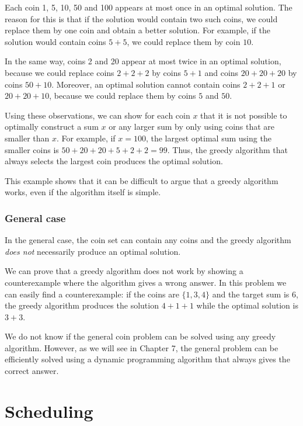 Each coin 1, 5, 10, 50 and 100 appears
at most once in an optimal solution.
The reason for this is that if the
solution would contain two such coins,
we could replace them by one coin and
obtain a better solution.
For example, if the solution would contain
coins $5+5$, we could replace them by coin $10$.

In the same way, coins 2 and 20 appear
at most twice in an optimal solution,
because we could replace
coins $2+2+2$ by coins $5+1$ and
coins $20+20+20$ by coins $50+10$.
Moreover, an optimal solution cannot contain
coins $2+2+1$ or $20+20+10$,
because we could replace them by coins $5$ and $50$.

Using these observations,
we can show for each coin $x$ that
it is not possible to optimally construct
a sum $x$ or any larger sum by only using coins
that are smaller than $x$.
For example, if $x=100$, the largest optimal
sum using the smaller coins is  $50+20+20+5+2+2=99$.
Thus, the greedy algorithm that always selects
the largest coin produces the optimal solution.

This example shows that it can be difficult
to argue that a greedy algorithm works,
even if the algorithm itself is simple.

\subsubsection{General case}

In the general case, the coin set can contain any coins
and the greedy algorithm \emph{does not} necessarily produce
an optimal solution.

We can prove that a greedy algorithm does not work
by showing a counterexample
where the algorithm gives a wrong answer.
In this problem we can easily find a counterexample:
if the coins are $\{1,3,4\}$ and the target sum
is 6, the greedy algorithm produces the solution
$4+1+1$ while the optimal solution is $3+3$.

We do not know if the general coin problem
can be solved using any greedy algorithm.
However, as we will see in Chapter 7,
the general problem can be efficiently
solved using a dynamic
programming algorithm that always gives the
correct answer.

\section{Scheduling}

